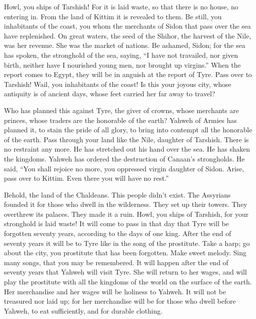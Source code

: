 Howl, you ships of Tarshish! For it is laid waste, so that there is no
house, no entering in. From the land of Kittim it is revealed to them.
 Be still, you inhabitants of the coast, you whom the
merchants of Sidon that pass over the sea have replenished. 
On great waters, the seed of the Shihor, the harvest of the Nile, was
her revenue. She was the market of nations.  Be ashamed,
Sidon; for the sea has spoken, the stronghold of the sea, saying, ``I
have not travailed, nor given birth, neither have I nourished young men,
nor brought up virgins.''  When the report comes to Egypt,
they will be in anguish at the report of Tyre.  Pass over to
Tarshish! Wail, you inhabitants of the coast!  Is this your
joyous city, whose antiquity is of ancient days, whose feet carried her
far away to travel?

 Who has planned this against Tyre, the giver of crowns,
whose merchants are princes, whose traders are the honorable of the
earth?  Yahweh of Armies has planned it, to stain the pride
of all glory, to bring into contempt all the honorable of the earth.
 Pass through your land like the Nile, daughter of
Tarshish. There is no restraint any more.  He has stretched
out his hand over the sea. He has shaken the kingdoms. Yahweh has
ordered the destruction of Canaan's strongholds.  He said,
``You shall rejoice no more, you oppressed virgin daughter of Sidon.
Arise, pass over to Kittim. Even there you will have no rest.''

 Behold, the land of the Chaldeans. This people didn't
exist. The Assyrians founded it for those who dwell in the wilderness.
They set up their towers. They overthrew its palaces. They made it a
ruin.  Howl, you ships of Tarshish, for your stronghold is
laid waste!  It will come to pass in that day that Tyre
will be forgotten seventy years, according to the days of one king.
After the end of seventy years it will be to Tyre like in the song of
the prostitute.  Take a harp; go about the city, you
prostitute that has been forgotten. Make sweet melody. Sing many songs,
that you may be remembered.  It will happen after the end
of seventy years that Yahweh will visit Tyre. She will return to her
wages, and will play the prostitute with all the kingdoms of the world
on the surface of the earth.  Her merchandise and her wages
will be holiness to Yahweh. It will not be treasured nor laid up; for
her merchandise will be for those who dwell before Yahweh, to eat
sufficiently, and for durable clothing.

